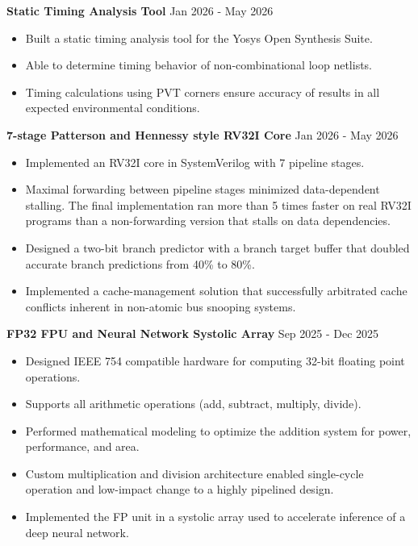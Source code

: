 \documentclass[10pt,letterpaper]{article}
\newcommand{\tightlist}{%
  \setlength{\itemsep}{0pt}%
  \setlength{\leftmargin}{1.0em}%
  \setlength{\parskip}{0pt}%
  \setlength{\topsep}{1.5pt}%
  \setlength{\parsep}{0pt}%
}
\newlength{\cvkeepskip}
\newcommand{\cvkeep}[1]{%
  \begingroup
    \setlength{\cvkeepskip}{#1}%
    \ifdim\pagegoal<\maxdimen
      \addtolength{\cvkeepskip}{\pagetotal}%
      \ifdim\cvkeepskip>\pagegoal
        \newpage
      \fi
    \fi
  \endgroup
}
\newcommand{\entrysep}{\vspace{2pt}\cvkeep{140pt}}
\newcommand{\cvwhen}[1]{\textsf{#1}}%
\begin{document}
\entrysep
\textbf{Static Timing Analysis Tool} \hfill \cvwhen{Jan 2026 - May 2026}
\begin{itemize}\tightlist
  \item Built a static timing analysis tool for the Yosys Open Synthesis Suite.
  \item Able to determine timing behavior of non-combinational loop netlists.
  \item Timing calculations using PVT corners ensure accuracy of results in all
    expected environmental conditions.
\end{itemize}

\entrysep
\textbf{7-stage Patterson and Hennessy style RV32I Core} \hfill
\cvwhen{Jan 2026 - May 2026}
\begin{itemize}\tightlist
  \item Implemented an RV32I core in SystemVerilog with 7 pipeline stages.
  \item Maximal forwarding between pipeline stages minimized data-dependent
    stalling. The final implementation ran more than 5 times faster on real
    RV32I programs than a non-forwarding version that stalls on data
    dependencies.
  \item Designed a two-bit branch predictor with a branch target buffer that
    doubled accurate branch predictions from 40\% to 80\%.
  \item Implemented a cache-management solution that successfully arbitrated
    cache conflicts inherent in non-atomic bus snooping systems.
\end{itemize}

\entrysep
\textbf{FP32 FPU and Neural Network Systolic Array} \hfill
\cvwhen{Sep 2025 - Dec 2025}
\begin{itemize}\tightlist
  \item Designed IEEE 754 compatible hardware for computing 32-bit floating
    point operations.
  \item Supports all arithmetic operations (add, subtract, multiply, divide).
  \item Performed mathematical modeling to optimize the addition system for
    power, performance, and area.
  \item Custom multiplication and division architecture enabled single-cycle
    operation and low-impact change to a highly pipelined design.
  \item Implemented the FP unit in a systolic array used to accelerate
    inference of a deep neural network.
\end{itemize}
\end{document}
